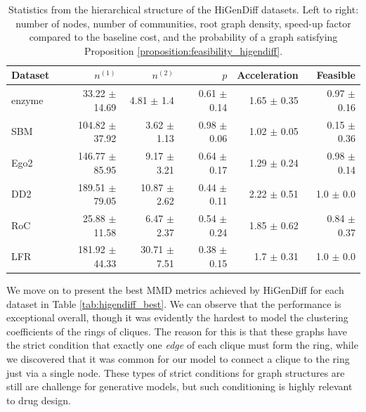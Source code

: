 \begin{table}[H]
    \centering
    \caption[Statistics from the hierarchical structure of the HiGenDiff datasets.]{Statistics from the hierarchical structure of the HiGenDiff datasets. Left to right: number of nodes, number of communities, root graph density, speed-up factor compared to the baseline cost, and the probability of a graph satisfying Proposition \ref{proposition:feasibility_higendiff}.}
    \label{tab:higendiff_datasets}
\begin{tabular}{lrrrrr}
\toprule
Dataset & $n^{(1)}$ & $n^{(2)}$ & $p$ & Acceleration & Feasible \\
\midrule
enzyme & 33.22 $\pm$ 14.69 & 4.81 $\pm$ 1.4 & 0.61 $\pm$ 0.14 & 1.65 $\pm$ 0.35 & 0.97 $\pm$ 0.16 \\
SBM & 104.82 $\pm$ 37.92 & 3.62 $\pm$ 1.13 & 0.98 $\pm$ 0.06 & 1.02 $\pm$ 0.05 & 0.15 $\pm$ 0.36 \\
Ego2 & 146.77 $\pm$ 85.95 & 9.17 $\pm$ 3.21 & 0.64 $\pm$ 0.17 & 1.29 $\pm$ 0.24 & 0.98 $\pm$ 0.14 \\
DD2 & 189.51 $\pm$ 79.05 & 10.87 $\pm$ 2.62 & 0.44 $\pm$ 0.11 & 2.22 $\pm$ 0.51 & 1.0 $\pm$ 0.0 \\
RoC & 25.88 $\pm$ 11.58 & 6.47 $\pm$ 2.37 & 0.54 $\pm$ 0.24 & 1.85 $\pm$ 0.62 & 0.84 $\pm$ 0.37 \\
LFR & 181.92 $\pm$ 44.33 & 30.71 $\pm$ 7.51 & 0.38 $\pm$ 0.15 & 1.7 $\pm$ 0.31 & 1.0 $\pm$ 0.0 \\
\bottomrule
\end{tabular}
\end{table}

We move on to present the best MMD metrics achieved by HiGenDiff for each dataset in Table \ref{tab:higendiff_best}. We can observe that the performance is exceptional overall, though it was evidently the hardest to model the clustering coefficients of the rings of cliques. The reason for this is that these graphs have the strict condition that exactly one \emph{edge} of each clique must form the ring, while we discovered that it was common for our model to connect a clique to the ring just via a single node. These types of strict conditions for graph structures are still are challenge for generative models, but such conditioning is highly relevant to drug design.

